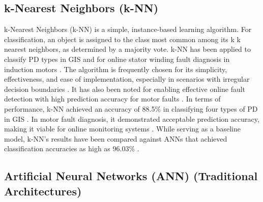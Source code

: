 \subsection{k-Nearest Neighbors (k-NN)}

k-Nearest Neighbors (k-NN) is a simple, instance-based learning algorithm. For classification, an object is assigned to the class most common among its k k nearest neighbors, as determined by a majority vote. k-NN has been applied to classify PD types in GIS \parencite{Bin_2020_1, Fei_2024_1} and for online stator winding fault diagnosis in induction motors \parencite{Sarkar_2021}. The algorithm is frequently chosen for its simplicity, effectiveness, and ease of implementation, especially in scenarios with irregular decision boundaries \parencite{Bin_2020_1}. It has also been noted for enabling effective online fault detection with high prediction accuracy for motor faults \parencite{Sarkar_2021}. In terms of performance, k-NN achieved an accuracy of 88.5\% in classifying four types of PD in GIS \parencite{Bin_2020_1}. In motor fault diagnosis, it demonstrated acceptable prediction accuracy, making it viable for online monitoring systems \parencite{Sarkar_2021}. While serving as a baseline model, k-NN's results have been compared against ANNs that achieved classification accuracies as high as 96.03\% \parencite{Haiba_2024}.

\subsection{Artificial Neural Networks (ANN) (Traditional Architectures)}

